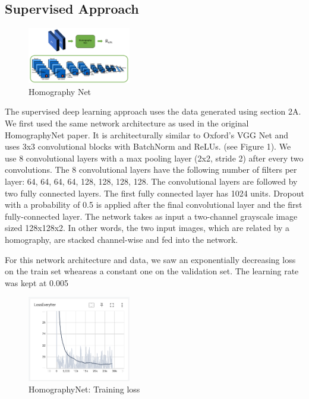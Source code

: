 \documentclass[conference]{IEEEtran}
\begin{document}
\subsection{Supervised Approach}

\begin{figure}[!htbp]
  \centering
  \includegraphics[width=0.4\textwidth]{phase1/HomographyNet.png}
  \caption{Homography Net}
  \label{fig:Homography Net}
\end{figure}

The supervised deep learning approach uses the data generated using section 2A. We first used the same network architecture as used in the original HomographyNet paper. It is architecturally similar to Oxford's VGG Net and uses 3x3 convolutional blocks with BatchNorm and ReLUs. (see Figure 1). We use 8 convolutional layers with a max pooling layer (2x2, stride 2) after every two convolutions. The 8 convolutional layers have the following number of filters per layer: 64, 64, 64, 64, 128, 128, 128, 128. The convolutional layers are followed by two fully connected layers. The first fully connected layer has 1024 units. Dropout with a probability of 0.5 is applied after the final convolutional layer and the first fully-connected layer.  The network takes as input a two-channel grayscale image sized 128x128x2. In other words, the two input images, which are related by a homography, are stacked channel-wise and fed into the network.

For this network architecture and data, we saw an exponentially decreasing loss on the train set wheareas a constant one on the validation set. The learning rate was kept at 0.005

\begin{figure}[!htbp]
  \centering
  \includegraphics[width=0.4\textwidth]{phase1/first_training_loss.png}
  \caption{HomographyNet: Training loss}
  \label{fig:HNet training loss}
\end{figure}
\end{document}
